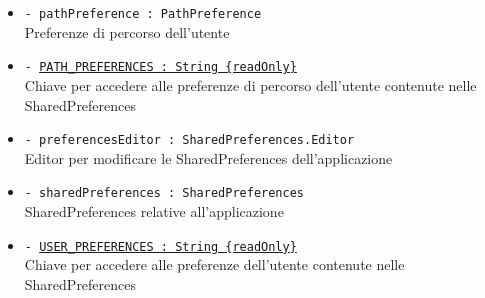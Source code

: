 \documentclass[../DefinizioneDiProdotto.tex]{subfiles}
\begin{document}
\begin{description}
\begin{itemize}
		\item \texttt{- pathPreference : PathPreference}\\
		Preferenze di percorso dell'utente
		
		\item \texttt{- \underline{PATH\_PREFERENCES : String \{readOnly\}}}\\
		Chiave per accedere alle preferenze di percorso dell'utente contenute nelle SharedPreferences
		
		\item \texttt{- preferencesEditor : SharedPreferences.Editor}\\
		Editor per modificare le SharedPreferences dell'applicazione
		
		\item \texttt{- sharedPreferences : SharedPreferences}\\
		SharedPreferences relative all'applicazione
		
		\item \texttt{- \underline{USER\_PREFERENCES : String \{readOnly\}}}\\
		Chiave per accedere alle preferenze dell'utente contenute nelle SharedPreferences
		

\end{itemize}
\end{description}
\end{document}
